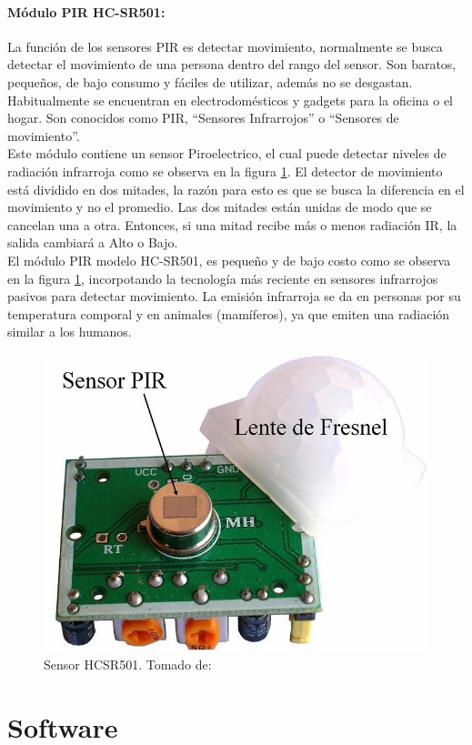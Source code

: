 \paragraph{Módulo PIR HC-SR501: }

La función de los sensores PIR es detectar movimiento, normalmente se busca detectar el movimiento de una persona dentro del rango del sensor. Son baratos, pequeños, de bajo consumo y fáciles de utilizar, además no se desgastan. Habitualmente se encuentran en electrodomésticos y gadgets para la oficina o el hogar. Son conocidos como PIR, ``Sensores Infrarrojos'' o ``Sensores de movimiento''.\\

Este módulo contiene un sensor Piroelectrico, el cual puede detectar niveles de radiación infrarroja como se observa en la figura \ref{fig:sensor-hc-sr501-1000-m}. El detector de movimiento está dividido en dos mitades, la razón para esto es que se busca la diferencia en el movimiento y no el promedio. Las dos mitades están unidas de modo que se cancelan una a otra. Entonces, si una mitad recibe más o menos radiación IR, la salida cambiará a Alto o Bajo. \cite{PIR1}\\

El módulo PIR modelo HC-SR501, es pequeño y de bajo costo como se observa en la figura \ref{fig:sensor-hc-sr501-1000-m}, incorpotando la tecnología más reciente en sensores infrarrojos pasivos para detectar movimiento. La emisión infrarroja se da en personas por su temperatura comporal y en animales (mamíferos), ya que emiten una radiación similar a los humanos. \cite{PIR2}

\begin{figure}[H]
	\centering
	\caption{Sensor HCSR501. Tomado de: \cite{PIR2}}
	\label{fig:sensor-hc-sr501-1000-m}
	\includegraphics[width=0.5\linewidth]{Imagenes/SENSOR-HC-SR501-1000-M}
\end{figure}

\section{Software}

